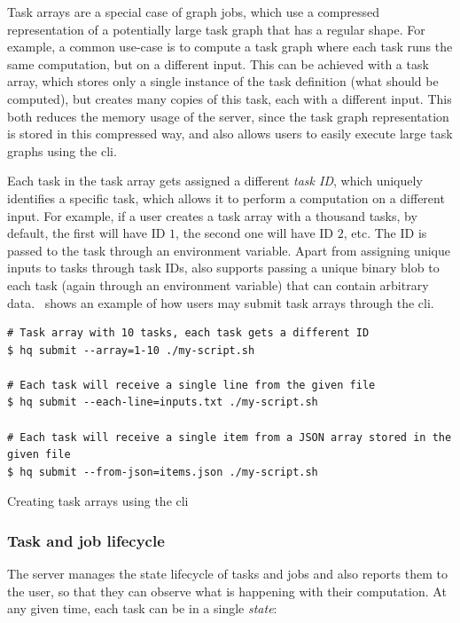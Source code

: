 Task arrays are a special case of graph jobs, which use a compressed representation of a
potentially large task graph that has a regular shape. For example, a common use-case is to compute
a task graph where each task runs the same computation, but on a different input. This can be
achieved with a task array, which stores only a single instance of the task definition (what should
be computed), but creates many copies of this task, each with a different input. This both reduces
the memory usage of the server, since the task graph representation is stored in this compressed
way, and also allows users to easily execute large task graphs using the \gls{cli}.

Each task in the task array gets assigned a different \emph{task ID}, which uniquely
identifies a specific task, which allows it to perform a computation on a different input. For
example, if a user creates a task array with a thousand tasks, by default, the first will have ID
$1$, the second one will have ID $2$, etc. The ID is passed
to the task through an environment variable. Apart from assigning unique inputs to tasks through
task IDs, \hq{} also supports passing a unique binary blob to each task (again
through an environment variable) that can contain arbitrary data.~ shows an
example of how users may submit task arrays through the \gls{cli}.

\begin{listing}[h]
	\begin{verbatim}
# Task array with 10 tasks, each task gets a different ID
$ hq submit --array=1-10 ./my-script.sh

# Each task will receive a single line from the given file
$ hq submit --each-line=inputs.txt ./my-script.sh

# Each task will receive a single item from a JSON array stored in the given file
$ hq submit --from-json=items.json ./my-script.sh
	\end{verbatim}
	\caption{Creating task arrays using the \hyperqueue{} \acrshort{cli}}
	\label{lst:hq-cli-task-arrays}
\end{listing}

\subsubsection*{Task and job lifecycle}
The server manages the state lifecycle of tasks and jobs and also reports them to the user, so that
they can observe what is happening with their computation. At any given time, each task can be in a
single \emph{state}:

